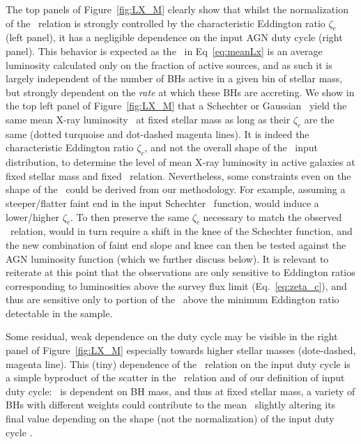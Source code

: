 The top panels of Figure~\ref{fig:LX_M} clearly show that whilst the normalization of the \LXMS\ relation is strongly controlled by the characteristic Eddington ratio $\zeta_c$ (left panel), it has a negligible dependence on the input AGN duty cycle (right panel). This behavior is expected as the \LX\ in Eq~\ref{eq:meanLx} is an average luminosity calculated only on the fraction of active sources, and as such it is largely independent of the number of BHs active in a given bin of stellar mass, but strongly dependent on the {\emph{rate}} at which these BHs are accreting. We show in the top left panel of Figure~\ref{fig:LX_M} that a Schechter or Gaussian \PLz\ yield the same mean X-ray luminosity \LX\ at fixed stellar mass as long as their $\zeta_c$ are the same (dotted turquoise and dot-dashed magenta lines). It is indeed the characteristic Eddington ratio $\zeta_c$, and not the overall shape of the \PLz\ input distribution, to determine the level of mean X-ray luminosity in active galaxies at fixed stellar mass and
fixed \MBHMS\ relation. Nevertheless, some constraints even on the shape of the \PLz\ could be derived from our methodology. For example, assuming a steeper/flatter faint end in the input Schechter \PLz\ function, would induce a lower/higher $\zeta_c$. To then preserve the same $\zeta_c$ necessary to match the observed \LXMS\ relation, would in turn require a shift in the knee of the Schechter function, and the new combination of faint end slope and knee can then be tested against the AGN luminosity function (which we further discuss below). It is relevant to reiterate at this point that the observations are only sensitive to Eddington ratios corresponding to luminosities above the survey flux limit (Eq.~\ref{eq:zeta_c}), and thus are sensitive only to portion of the \PLz\ above the minimum Eddington ratio detectable in the sample.

Some residual, weak dependence on the duty cycle may be visible in the right panel of Figure~\ref{fig:LX_M} especially towards higher stellar masses (dote-dashed, magenta line). This (tiny) dependence of the \LXMS\ relation on the input duty cycle is a simple byproduct of the scatter in the \MBHMS\ relation and of our definition of input duty cycle: \UMBHz\ is dependent on BH mass, and thus at fixed stellar mass, a variety of BHs with different weights could contribute to the mean \LX\, slightly altering its final value depending on the shape (not the normalization) of the input duty cycle \UMBHz{}.

